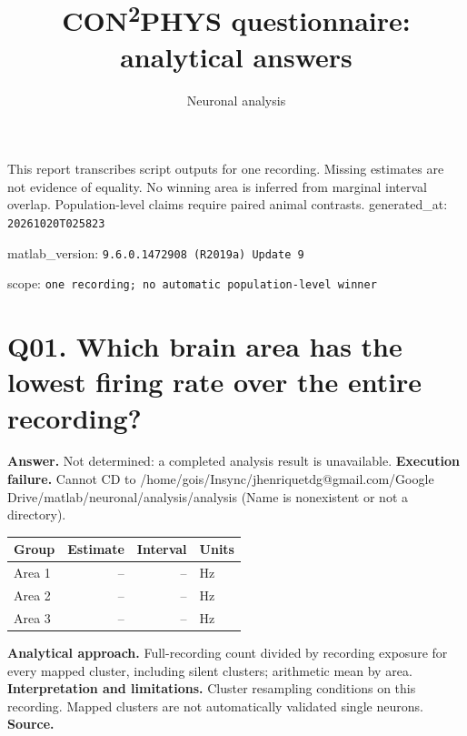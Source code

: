 \documentclass[11pt,a4paper]{article}
\begin{document}
\raggedright
\title{CON\textsuperscript{2}PHYS questionnaire: analytical answers}\author{Neuronal analysis}\date{}\maketitle
This report transcribes script outputs for one recording. Missing estimates are not evidence of equality. No winning area is inferred from marginal interval overlap. Population-level claims require paired animal contrasts.
generated\_at: \texttt{20261020T025823}\par
matlab\_version: \texttt{9.6.0.1472908 (R2019a) Update 9}\par
scope: \texttt{one recording; no automatic population-level winner}\par
\clearpage
\section*{Q01. Which brain area has the lowest firing rate over the entire recording?}
\textbf{Answer.} Not determined: a completed analysis result is unavailable.
\textbf{Execution failure.} Cannot CD to /home/gois/Insync/jhenriquetdg@gmail.com/Google Drive/matlab/neuronal/analysis/analysis (Name is nonexistent or not a directory).
\begin{tabularx}{\linewidth}{XrrX}\toprule Group & Estimate & Interval & Units \\\midrule
Area 1 & -- & -- & Hz \\
Area 2 & -- & -- & Hz \\
Area 3 & -- & -- & Hz \\
\bottomrule\end{tabularx}
\textbf{Analytical approach.} Full-recording count divided by recording exposure for every mapped cluster, including silent clusters; arithmetic mean by area.
\textbf{Interpretation and limitations.} Cluster resampling conditions on this recording. Mapped clusters are not automatically validated single neurons.
\textbf{Source.} 
\clearpage
\end{document}
